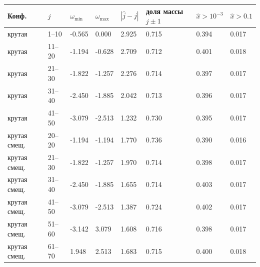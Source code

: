 \begin{tabular}{|l|l|l|l|l|l|l|l|}
\hline
Конф. & $j$ & $\omega_{\min}$ & $\omega_{\max}$ & $|\hat j-j|$ & доля массы $j\pm1$ & $\widehat x>10^{-3}$ & $\widehat x>0.1$ \\
\hline
крутая & 1--10 & -0.565 & 0.000 & 2.925 & 0.715 & 0.394 & 0.017 \\
\hline
крутая & 11--20 & -1.194 & -0.628 & 2.709 & 0.712 & 0.401 & 0.018 \\
\hline
крутая & 21--30 & -1.822 & -1.257 & 2.276 & 0.714 & 0.397 & 0.017 \\
\hline
крутая & 31--40 & -2.450 & -1.885 & 2.042 & 0.713 & 0.396 & 0.017 \\
\hline
крутая & 41--50 & -3.079 & -2.513 & 1.232 & 0.730 & 0.395 & 0.017 \\
\hline
крутая смещ. & 20--20 & -1.194 & -1.194 & 1.770 & 0.736 & 0.390 & 0.016 \\
\hline
крутая смещ. & 21--30 & -1.822 & -1.257 & 1.970 & 0.714 & 0.398 & 0.017 \\
\hline
крутая смещ. & 31--40 & -2.450 & -1.885 & 1.655 & 0.714 & 0.403 & 0.017 \\
\hline
крутая смещ. & 41--50 & -3.079 & -2.513 & 1.387 & 0.724 & 0.402 & 0.017 \\
\hline
крутая смещ. & 51--60 & -3.142 & 3.079 & 1.608 & 0.716 & 0.398 & 0.017 \\
\hline
крутая смещ. & 61--70 & 1.948 & 2.513 & 1.683 & 0.715 & 0.400 & 0.018 \\
\hline
\end{tabular}
